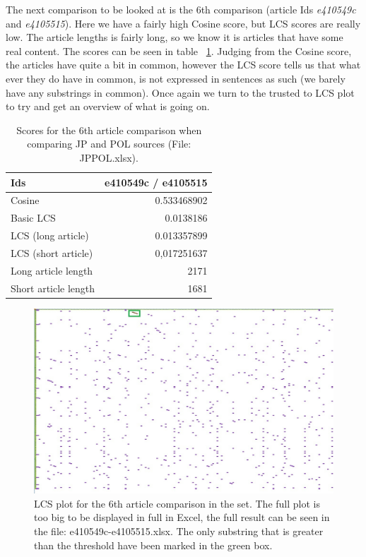 The next comparison to be looked at is the 6th comparison (article Ids \textit{e410549c} and \textit{e4105515}). Here we have a fairly high Cosine score, but LCS scores are really low. The article lengths is fairly long, so we know it is articles that have some real content. The scores can be seen in table ~\ref{JPPOLSameContent}. Judging from the Cosine score, the articles have quite a bit in common, however the LCS score tells us that what ever they do have in common, is not expressed in sentences as such (we barely have any substrings in common). Once again we turn to the trusted to LCS plot to try and get an overview of what is going on.

\begin{table}
\begin{center}
	\begin{tabular}{l | r}
	Ids & e410549c / e4105515\\ \hline
	Cosine & 0.533468902\\ \hline
	Basic LCS & 0.0138186\\ \hline
	LCS (long article) & 0.013357899\\ \hline
	LCS (short article) & 0,017251637\\ \hline
	Long article length & 2171\\ \hline
	Short article length & 1681\\ \hline	
	\end{tabular}
\end{center}
\caption{Scores for the 6th article comparison when comparing JP and POL sources (File: JPPOL.xlsx).}
\label{JPPOLSameContent}
\end{table}

\begin{figure}
	\centering
	\includegraphics[scale=0.3]{figures/e410549c}
	\caption{LCS plot for the 6th article comparison in the set. The full plot is too big to be displayed in full in Excel, the full result can be seen in the file: e410549c-e4105515.xlsx. The only substring that is greater than the threshold have been marked in the green box.}
	\label{SameContent}
\end{figure}

